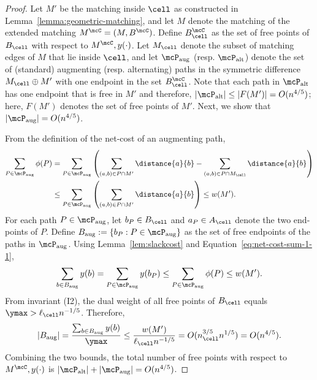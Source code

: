\highMax*
\begin{proof}
    Let $M'$ be the matching inside $\cell$ as constructed in Lemma~\ref{lemma:geometric-matching}, and let $M$ denote the matching of the extended matching $M^\mcC=(M, B^\mcC)$.
    Define $B^\mcC_\cell$ as the set of free points of $B_\cell$ with respect to $M^\mcC,y(\cdot)$. Let $M_\cell$ denote the subset of matching edges of $M$ that lie inside $\cell$, and let $\mcP_{\mathrm{aug}}$ (resp. $\mcP_{\mathrm{alt}}$) denote the set of (standard) augmenting (resp. alternating) paths in the symmetric difference $M_\cell\oplus M'$ with one endpoint in the set $B^\mcC_\cell$. Note that each path in $\mcP_{\mathrm{alt}}$ has one endpoint that is free in $M'$ and therefore, $|\mcP_{\mathrm{alt}}|\le |F(M')|=O(n^{4/5})$; here, $F(M')$ denotes the set of free points of $M'$. Next, we show that $|\mcP_{\mathrm{aug}}|=O(n^{4/5})$.

    From the definition of the net-cost of an augmenting path,
    \begin{align}
        \sum_{P\in \mcP_{\mathrm{aug}}} \phi(P) &= \sum_{P\in \mcP_{\mathrm{aug}}} \left(\sum_{(a,b)\in P\cap M'}\distance{a}{b} - \sum_{(a,b)\in P\cap M_\cell}\distance{a}{b} \right)\nonumber\\ &\le \sum_{P\in \mcP_{\mathrm{aug}}} \left(\sum_{(a,b)\in P\cap M'}\distance{a}{b}\right)\le w(M').\label{eq:net-cost-sum-1-1}
    \end{align}
    For each path $P\in \mcP_{\mathrm{aug}}$, let $b_P\in B_\cell$ and $a_P\in A_\cell$ denote the two end-points of $P$. Define $B_{\mathrm{aug}}:=\{b_P:P\in \mcP_{\mathrm{aug}}\}$ as the set of free endpoints of the paths in $\mcP_{\mathrm{aug}}$. Using Lemma~\ref{lem:slackcost} and Equation~\eqref{eq:net-cost-sum-1-1}, 
    \begin{align}
        \sum_{b\in B_{\mathrm{aug}}} y(b) = \sum_{P\in \mcP_{\mathrm{aug}}} y(b_P)\le \sum_{P\in \mcP_{\mathrm{aug}}} \phi(P) \le w(M') .\label{eq:net-cost-sum-2-1}
    \end{align}
    From invariant (I2), the dual weight of all free points of $B_\cell$ equals $\ymax>\ell_\cell n^{-1/5}$. Therefore,
    \begin{equation*}\label{eq:net-cost-sum-2-2}
        |B_{\mathrm{aug}}| = \frac{\sum_{b\in B_{\mathrm{aug}}} y(b)}{\ymax} \le \frac{w(M')}{\ell_\cell n^{-1/5}}=O(n_\cell^{3/5}n^{1/5}) = O(n^{4/5}).
    \end{equation*}
    Combining the two bounds, the total number of free points with respect to $M^\mcC, y(\cdot)$ is $|\mcP_{\mathrm{alt}}|+|\mcP_{\mathrm{aug}}|=O(n^{4/5})$.
\end{proof}

